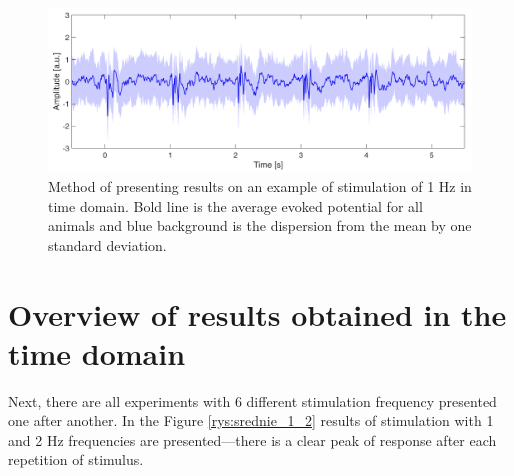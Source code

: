 \documentclass{pracalicmgr}
\begin{document}
	\begin{figure}[H]
		\centering
		\includegraphics[width=1.\linewidth]{przyklad_odch2.png}
		\caption{Method of presenting results on an example of stimulation of 1 Hz in time domain. Bold line is the average evoked potential for all animals and blue background is the dispersion from the mean by one standard deviation. }
		\label{rys:przyklad_odch}
	\end{figure}

    \section{Overview of results obtained in the time domain}
    \label{sec:time}
    Next, there are all experiments with 6 different stimulation frequency presented one after another. In the Figure \ref{rys:srednie_1_2} results of stimulation with 1 and 2 Hz frequencies are presented---there is a clear peak of response after each repetition of stimulus.
    
\end{document}
